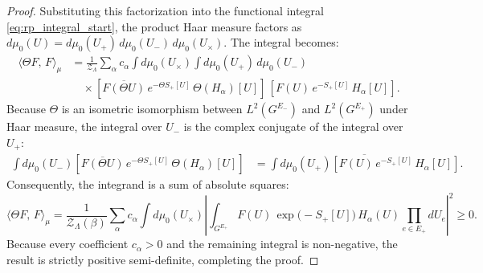 \begin{proof}
Substituting this factorization into the functional integral \eqref{eq:rp_integral_start}, the product Haar measure factors as $d\mu_0(U) = d\mu_0(U_+) \, d\mu_0(U_-) \, d\mu_0(U_\times)$. The integral becomes:
\begin{align}
\langle \Theta F, \, F \rangle_\mu &= \frac{1}{\mathcal{Z}_\Lambda} \sum_\alpha c_\alpha \int d\mu_0(U_\times) \int d\mu_0(U_+) \, d\mu_0(U_-) \nonumber \\
&\quad \times \left[ \overline{F(\Theta U)} \, e^{-\Theta S_+[U]} \, \Theta(H_\alpha)[U] \right] \, \left[ F(U) \, e^{-S_+[U]} \, H_\alpha[U] \right].
\end{align}
Because $\Theta$ is an isometric isomorphism between $L^2(G^{E_-})$ and $L^2(G^{E_+})$ under Haar measure, the integral over $U_-$ is the complex conjugate of the integral over $U_+$:
\begin{align}
\int d\mu_0(U_-) \left[ \overline{F(\Theta U)} \, e^{-\Theta S_+[U]} \, \Theta(H_\alpha)[U] \right] &= \overline{\int d\mu_0(U_+) \left[ F(U) \, e^{-S_+[U]} \, H_\alpha[U] \right]}.
\end{align}
Consequently, the integrand is a sum of absolute squares:
\begin{equation}
\langle \Theta F, \, F \rangle_\mu = \frac{1}{\mathcal{Z}_\Lambda(\beta)} \sum_\alpha c_\alpha \int d\mu_0(U_\times) \left| \int_{G^{E_+}} F(U) \, \exp\bigl( -S_+[U] \bigr) \, H_\alpha(U) \prod_{e \in E_+} dU_e \right|^2 \ge 0.
\end{equation}
Because every coefficient $c_\alpha > 0$ and the remaining integral is non-negative, the result is strictly positive semi-definite, completing the proof.
\end{proof}

